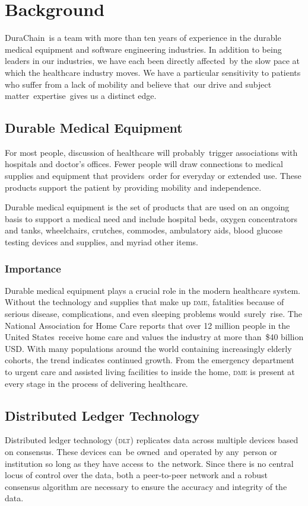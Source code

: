 
\section{Background}
DuraChain is a team with more than ten years of experience in the durable medical equipment and software engineering industries. In addition to being leaders in our industries, we have each been directly affected by the slow pace at which the healthcare industry moves. We have a particular sensitivity to patients who suffer from a lack of mobility and believe that our drive and subject matter expertise gives us a distinct edge.%

\subsection{Durable Medical Equipment}
For most people, discussion of healthcare will probably trigger associations with hospitals and doctor's offices. Fewer people will draw connections to medical supplies and equipment that providers order for everyday or extended use. These products support the patient by providing mobility and independence.%

Durable medical equipment is the set of products that are used on an ongoing basis to support a medical need and include hospital beds, oxygen concentrators and tanks, wheelchairs, crutches, commodes, ambulatory aids, blood glucose testing devices and supplies, and myriad other items.\cite{dmeDefinition}%

\subsubsection{Importance}
Durable medical equipment plays a crucial role in the modern healthcare system. Without the technology and supplies that make up \textsc{dme}, fatalities because of serious disease, complications, and even sleeping problems would surely rise. The National Association for Home Care reports that over 12 million people in the United States receive home care and values the industry at more than \$40 billion USD.\cite{homecarestats}\cite{dmemarket} With many populations around the world containing increasingly elderly cohorts, the trend indicates continued growth. From the emergency department to urgent care and assisted living facilities to inside the home, \textsc{dme} is present at every stage in the process of delivering healthcare.%

\subsection{Distributed Ledger Technology}
Distributed ledger technology (\textsc{dlt}) replicates data across multiple devices based on consensus. These devices can be owned and operated by any person or institution so long as they have access to the network. Since there is no central locus of control over the data, both a peer-to-peer network and a robust consensus algorithm are necessary to ensure the accuracy and integrity of the data.\cite{DLT}%

